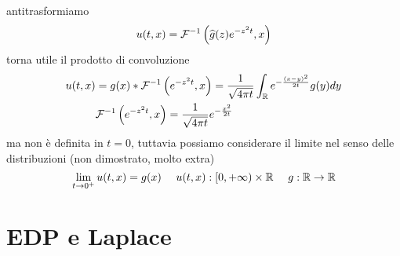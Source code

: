 antitrasformiamo
\begin{equation*}
u(t, x) = \mathcal{F}^{- 1}\left(\widehat{g}(z) e^{- z^{2} t}, x\right)
\end{equation*}
torna utile il prodotto di convoluzione
\begin{equation*}
\begin{aligned}
u(t, x) & = g(x) *\mathcal{F}^{- 1}\left(e^{- z^{2} t}, x\right) = \frac{1}{\sqrt{4\pi t}}\int_{\mathbb{R}} e^{- \frac{(x - y)^{2}}{2t}} g(y) dy\\
 & \mathcal{F}^{- 1}\left(e^{- z^{2} t}, x\right) = \frac{1}{\sqrt{4\pi t}} e^{- \frac{x^{2}}{2t}}
\end{aligned}
\end{equation*}
ma non è definita in $t = 0$, tuttavia possiamo considerare il limite nel senso delle distribuzioni (non dimostrato, molto extra)
\begin{equation*}
\lim_{t\rightarrow 0^{+}} u(t, x) = g(x) \ \ \ \ u(t, x) : [0, + \infty) \times \RR \ \ \ \ g: \RR\rightarrow \RR
\end{equation*}

\section{EDP e Laplace}

